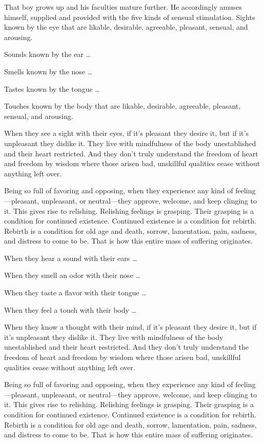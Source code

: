 \documentclass[12pt,openany]{book}%
\begin{document}
That boy grows up and his faculties mature further. He accordingly amuses himself, supplied and provided with the five kinds of sensual stimulation. Sights known by the eye that are likable, desirable, agreeable, pleasant, sensual, and arousing. 

Sounds known by the ear … 

Smells known by the nose … 

Tastes known by the tongue … 

Touches known by the body that are likable, desirable, agreeable, pleasant, sensual, and arousing. 

When they see a sight with their eyes, if it’s pleasant they desire it, but if it’s unpleasant they dislike it. They live with mindfulness of the body unestablished and their heart restricted. And they don’t truly understand the freedom of heart and freedom by wisdom where those arisen bad, unskillful qualities cease without anything left over. 

Being so full of favoring and opposing, when they experience any kind of feeling—pleasant, unpleasant, or neutral—they approve, welcome, and keep clinging to it. This gives rise to relishing. Relishing feelings is grasping. Their grasping is a condition for continued existence. Continued existence is a condition for rebirth. Rebirth is a condition for old age and death, sorrow, lamentation, pain, sadness, and distress to come to be. That is how this entire mass of suffering originates. 

When they hear a sound with their ears … 

When they smell an odor with their nose … 

When they taste a flavor with their tongue … 

When they feel a touch with their body … 

When they know a thought with their mind, if it’s pleasant they desire it, but if it’s unpleasant they dislike it. They live with mindfulness of the body unestablished and their heart restricted. And they don’t truly understand the freedom of heart and freedom by wisdom where those arisen bad, unskillful qualities cease without anything left over. 

Being so full of favoring and opposing, when they experience any kind of feeling—pleasant, unpleasant, or neutral—they approve, welcome, and keep clinging to it. This gives rise to relishing. Relishing feelings is grasping. Their grasping is a condition for continued existence. Continued existence is a condition for rebirth. Rebirth is a condition for old age and death, sorrow, lamentation, pain, sadness, and distress to come to be. That is how this entire mass of suffering originates. 
\end{document}
